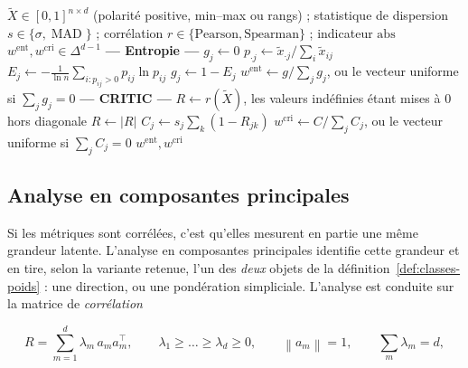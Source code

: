 \documentclass[11pt,a4paper]{article}
\theoremstyle{definition}
\theoremstyle{remark}
\newcommand{\norm}[1]{\left\lVert #1 \right\rVert}
\newcommand{\abs}[1]{\left\lvert #1 \right\rvert}
\newcommand{\simplex}{\Delta^{d-1}}
\newcommand{\MAD}{\operatorname{MAD}}
\begin{document}
\begin{algorithm}[htbp]
  \caption{Pondérations par entropie et par CRITIC}
  \label{algo:poids-dispersion}
  \begin{algorithmic}[1]
    \Require $\tilde{X} \in [0,1]^{n \times d}$ (polarité positive, min--max ou rangs) ;
      statistique de dispersion $s \in \{\sigma, \MAD\}$ ; corrélation
      $r \in \{\text{Pearson}, \text{Spearman}\}$ ; indicateur $\mathrm{abs}$
    \Ensure $w^{\mathrm{ent}}, w^{\mathrm{cri}} \in \simplex$
    \Statex \textbf{--- Entropie ---}
        \State $g_j \gets 0$ 
      \Else
        \State $p_{\cdot j} \gets \tilde{x}_{\cdot j} / \sum_i \tilde{x}_{ij}$
        \State $E_j \gets -\frac{1}{\ln n}\sum_{i : p_{ij} > 0} p_{ij}\ln p_{ij}$
        \State $g_j \gets 1 - E_j$
      \EndIf
    \EndFor
    \State $w^{\mathrm{ent}} \gets g / \sum_j g_j$, ou le vecteur uniforme si
      $\sum_j g_j = 0$
    \Statex \textbf{--- CRITIC ---}
    \State $R \gets r(\tilde{X})$, les valeurs indéfinies étant mises à $0$ hors
      diagonale
     \State $R \gets \abs{R}$ \EndIf
      \State $C_j \gets s_j \sum_k (1 - R_{jk})$
    \EndFor
    \State $w^{\mathrm{cri}} \gets C / \sum_j C_j$, ou le vecteur uniforme si
      $\sum_j C_j = 0$
    \State \Return $w^{\mathrm{ent}}, w^{\mathrm{cri}}$
  \end{algorithmic}
\end{algorithm}

\bigskip

\subsection{Analyse en composantes principales}
\label{sec:acp}

\medskip

Si les métriques sont corrélées, c'est qu'elles mesurent en partie une même grandeur
latente. L'analyse en composantes principales identifie cette grandeur et en tire, selon
la variante retenue, l'un des \emph{deux} objets de la
définition~\ref{def:classes-poids} : une direction, ou une pondération simpliciale.
L'analyse est conduite sur la matrice de \emph{corrélation}

\medskip

\[
  R = \sum_{m=1}^{d} \lambda_m\, a_m a_m^\top,
  \qquad \lambda_1 \ge \dots \ge \lambda_d \ge 0,
  \qquad \norm{a_m} = 1,
  \qquad \sum_m \lambda_m = d,
\]
\end{document}

